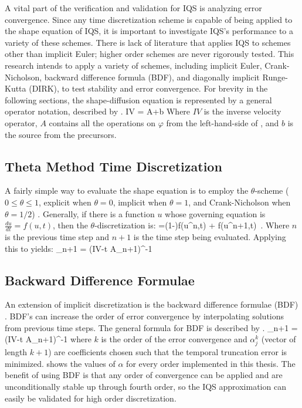 A vital part of the verification and validation for IQS is analyzing error convergence.  Since any time discretization scheme is capable of being applied to the shape equation of IQS, it is important to investigate IQS's performance to a variety of these schemes.  There is lack of literature that applies IQS to schemes other than implicit Euler; higher order schemes are never rigorously tested.  This research intends to apply a variety of schemes, including implicit Euler, Crank-Nicholson, backward difference formula (BDF), and diagonally implicit Runge-Kutta (DIRK), to test stability and error convergence.  For brevity in the following sections, the shape-diffusion equation is represented by a general operator notation, described by .
\be 
IV = A\varphi+b
\label{eq:shape_mat}
\ee
Where $IV$ is the inverse velocity operator, $A$ contains all the operations on $\varphi$ from the left-hand-side of , and $b$ is the source from the precursors. 

\subsection{Theta Method Time Discretization}
\label{sect:theta}

A fairly simple way to evaluate the shape equation is to employ the $\theta$-scheme ($0\le\theta\le1$, explicit when $\theta=0$, implicit when $\theta=1$, and Crank-Nicholson when $\theta=1/2$) \cite{Ferziger}.  Generally, if there is a function $u$ whose governing equation is $\frac{du}{dt}=f(u,t)$, then the $\theta$-discretization is:
\be
{}=(1-\theta)f(u^n,t) + \theta f(u^{n+1},t) \,.
\ee
Where $n$ is the previous time step and $n+1$ is the time step being evaluated. Applying this to  yields:
\be
\varphi_{n+1} = (IV-\Delta t A_{n+1})^{-1}
\ee

\subsection{Backward Difference Formulae}

An extension of implicit discretization is the backward difference formulae (BDF) \cite{Gear:2007}.  BDF's can increase the order of error convergence by interpolating solutions from previous time steps. The general formula for BDF is described by .
\be 
\varphi_{n+1} = (IV-\Delta t A_{n+1})^{-1}\left[IV\sum_{j=1}^{k}\alpha_{j}^{k}\varphi_{n-(k-j)} +
\Delta t \alpha_{k+1}^{k} b_{n+1}\right]
\label{eq:bdf}
\ee
where $k$ is the order of the error convergence and $\alpha_{j}^{k}$ (vector of length $k+1$) are coefficients chosen such that the temporal truncation error is minimized.   shows the values of $\alpha$ for every order implemented in this thesis. The benefit of using BDF is that any order of convergence can be applied and are unconditionally stable up through fourth order, so the IQS approximation can easily be validated for high order discretization.

